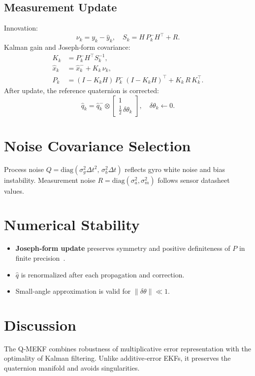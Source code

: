 \documentclass[12pt]{article}
\begin{document}
\subsection{Measurement Update}
Innovation:
\[
\nu_k = y_k - \hat y_k,\quad
S_k = H\,P^-_k H^\top + R.
\]
Kalman gain and Joseph‐form covariance:
\begin{align*}
K_k &= P^-_k H^\top S_k^{-1},\\
\hat x_k &= \hat x^-_k + K_k\,\nu_k,\\
P_k &= (I-K_kH)\,P^-_k\,(I-K_kH)^\top + K_k\,R\,K_k^\top.
\end{align*}
After update, the reference quaternion is corrected:
\[
\hat q_k = \hat q^-_k \otimes \begin{bmatrix}1\\\tfrac12\,\delta\theta_k\end{bmatrix}, 
\quad \delta\theta_k \leftarrow 0.
\]

\section{Noise Covariance Selection}
Process noise \(Q = \mathrm{diag}(\sigma_g^2\Delta t^2,\,\sigma_b^2\Delta t)\) reflects gyro white noise and bias instability.  Measurement noise \(R = \mathrm{diag}(\sigma_a^2,\sigma_m^2)\) follows sensor datasheet values.

\section{Numerical Stability}
\begin{itemize}
  \item \textbf{Joseph‐form update} preserves symmetry and positive definiteness of \(P\) in finite precision~\cite{Maybeck1979}.
  \item \(\hat q\) is renormalized after each propagation and correction.
  \item Small‐angle approximation is valid for \(\|\delta\theta\|\ll1\).
\end{itemize}

\section{Discussion}
The Q‐MEKF combines robustness of multiplicative error representation with the optimality of Kalman filtering.  Unlike additive‐error EKFs, it preserves the quaternion manifold and avoids singularities.
\end{document}

